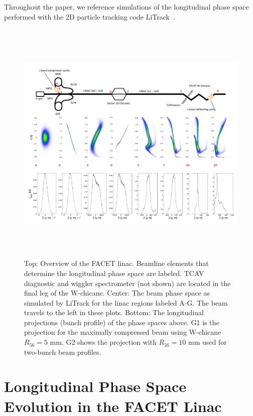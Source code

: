 \documentclass[%
twocolumn,
showpacs,preprintnumbers,
 aps,
prstab,
]{revtex4-1}
\begin{document}
Throughout the paper, we reference simulations of the longitudinal phase space performed with the 2D particle tracking code LiTrack~\cite{litrack}.

\begin{figure}[htb]
\includegraphics[width=\textwidth,height=12cm]{figures/facet_schem.pdf}
  \caption{Top: Overview of the FACET linac. Beamline elements that determine the longitudinal phase space are labeled. TCAV diagnostic and wiggler spectrometer (not shown) are located in the final leg of the W-chicane. Center: The beam phase space as simulated by LiTrack for the linac regions labeled A-G. The beam travels to the left in these plots. Bottom: The longitudinal projections (bunch profile) of the phase spaces above. G1 is the projection for the maximally compressed beam using W-chicane $R_{56} = 5$ mm. G2 shows the projection with $R_{56} = 10$ mm used for two-bunch beam profiles.}
  \label{schem}
\end{figure}


\section{Longitudinal Phase Space Evolution in the FACET Linac}\label{sec:facet}
\end{document}
